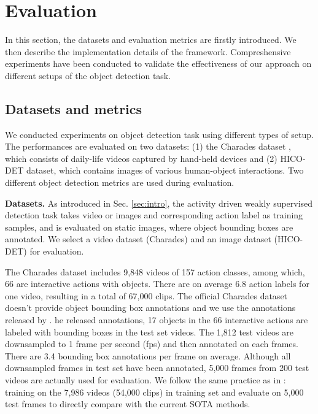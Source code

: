 \section{Evaluation}
\label{sec:evaluation}
In this section, the datasets and evaluation metrics are firstly introduced. We then describe the implementation details of the framework. Compreshensive experiments have been conducted to validate the effectiveness of our approach on different setups of the object detection task.

\subsection{Datasets and metrics}
We conducted experiments on object detection task using different types of setup. The performances are evaluated on two datasets: (1) the Charades dataset \cite{sigurdsson2016hollywood}, which consists of daily-life videos captured by hand-held devices and (2) HICO-DET dataset, which contains images of various human-object interactions.
Two different object detection metrics are used during evaluation.

\textbf{Datasets.} As introduced in Sec. \ref{sec:intro}, the activity driven weakly supervised detection task takes video or images and corresponding action label as training samples, and is evaluated on static images, where object bounding boxes are annotated. We select a video dataset (Charades) and an image dataset (HICO-DET) for evaluation.

 The Charades dataset includes 9,848 videos of 157 action classes, among which, 66 are interactive actions with objects. There are on average 6.8 action labels for one video, resulting in a total of 67,000 clips. The official Charades dataset doesn't provide object bounding box annotations and we use the annotations released by \cite{yuan2017temporal}. 
he released annotations, 17 objects in the 66 interactive actions are labeled with bounding boxes in the test set videos. The 1,812 test videos are downsampled to 1 frame per second (fps) and then annotated on each frames. There are 3.4 bounding box annotations per frame on average. Although all downsampled frames in test set have been annotated, 5,000 frames from 200 test videos are actually used for evaluation. We follow the same practice as in \cite{yuan2017temporal}: training on the 7,986 videos (54,000 clips) in training set and evaluate on 5,000 test frames to directly compare with the current SOTA methods.


